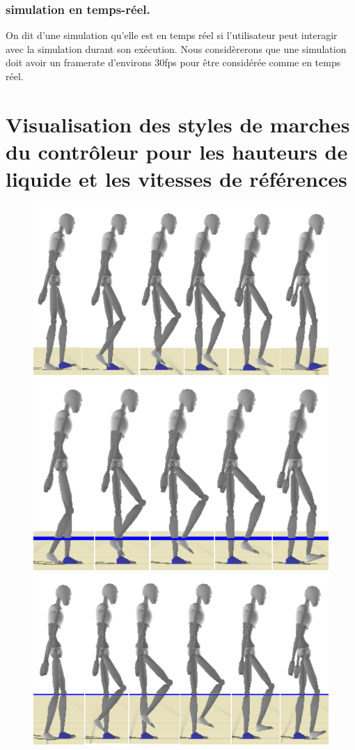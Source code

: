 \documentclass[runningheads,a4paper]{llncs}
\begin{document}
\subsubsection{simulation en temps-réel.} On dit d'une simulation qu'elle est en temps réel si l'utilisateur peut interagir avec la simulation durant son exécution. Nous considèrerons que une simulation doit avoir un framerate d'environs 30fps pour être considérée comme en temps réel.


\newpage
\section{Visualisation des styles de marches du contrôleur pour les hauteurs de liquide et les vitesses de références}
\label{sec:complex_controler_reference}

\begin{figure}[h]
\centering
\includegraphics[scale=0.3]{strips/03_0cm.png}
\includegraphics[scale=0.3]{strips/03_25cm.png}
\includegraphics[scale=0.3]{strips/03_50cm.png}

\end{figure}
\end{document}
